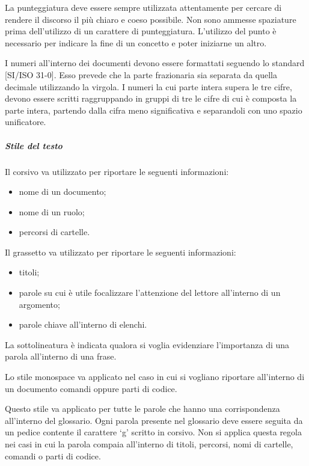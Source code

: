 \documentclass[../NormeProgetto.tex]{subfiles}
\begin{document}
			La punteggiatura  deve essere sempre utilizzata attentamente per cercare di rendere il discorso il più chiaro e coeso possibile. Non sono ammesse spaziature prima dell'utilizzo di un carattere di punteggiatura. L'utilizzo del punto è necessario per indicare la fine di un concetto e poter iniziarne un altro.
			
			I numeri all'interno dei documenti devono essere formattati seguendo lo standard [SI/ISO 31-0]. Esso prevede che la parte frazionaria sia separata da quella decimale utilizzando la virgola. I numeri la cui parte intera supera le tre cifre, devono essere scritti raggruppando in gruppi di tre le cifre di cui è composta la parte intera, partendo dalla cifra meno significativa e separandoli con uno spazio unificatore.
			
		\subparagraph{Stile del testo}

			Il corsivo va utilizzato per riportare le seguenti informazioni:
			\begin{itemize}
				\item nome di un documento;
				\item nome di un ruolo;
				\item percorsi di cartelle.
			\end{itemize}						
			
			Il grassetto va utilizzato per riportare le seguenti informazioni:
			\begin{itemize}
				\item titoli;
				\item parole su cui è utile focalizzare l'attenzione del lettore all'interno di un argomento;
				\item parole chiave all'interno di elenchi.
			\end{itemize}						
			
			La sottolineatura è indicata qualora si voglia evidenziare l'importanza di una parola all'interno di una frase.					
			
			Lo stile monospace va applicato nel caso in cui si vogliano riportare all'interno di un documento	comandi oppure parti di codice.
			
			\label{sec:Formattazione termini nel glossario}
			Questo stile va applicato per tutte le parole che hanno una corrispondenza all'interno del glossario. Ogni parola presente nel glossario deve essere seguita da un pedice contente il carattere `g' scritto in corsivo. Non si applica questa regola nei casi in cui la parola compaia all'interno di titoli, percorsi, nomi di cartelle, comandi o parti di codice.
			
\end{document}
